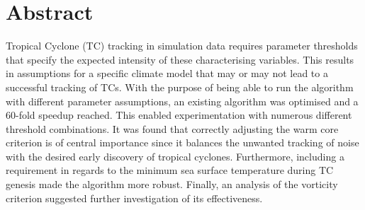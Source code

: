 
 \setcounter{tocdepth}{2}
 \tableofcontents



\chapter*{Abstract}
Tropical Cyclone (TC) tracking in simulation data requires parameter thresholds that specify the expected intensity of these characterising variables. This results in assumptions for a specific climate model that may or may not lead to a successful tracking of TCs. With the purpose of being able to run the algorithm with different parameter assumptions, an existing algorithm was optimised and a 60-fold speedup reached. This enabled experimentation with numerous different threshold combinations. It was found that correctly adjusting the warm core criterion is of central importance since it balances the unwanted tracking of noise with the desired early discovery of tropical cyclones. Furthermore, including a requirement in regards to the minimum sea surface temperature during TC genesis made the algorithm more robust. Finally, an analysis of the vorticity criterion suggested further investigation of its effectiveness.